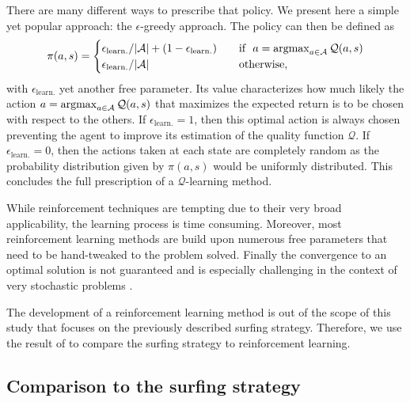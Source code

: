 There are many different ways to prescribe that policy. We present here a simple yet popular approach: the $\epsilon$-greedy approach.
The policy can then be defined as
\begin{equation}
	\pi(a, s) = \begin{cases}
		\epsilon_{\mathrm{learn.}}/\lvert\mathcal{A}\rvert + (1 - \epsilon_{\mathrm{learn.}}) & \quad \text{if}~~a = \operatorname{argmax}_{a \in \mathcal{A}} \mathcal{Q}(a, s)\\
		\epsilon_{\mathrm{learn.}}/\lvert\mathcal{A}\rvert & \quad \text{otherwise},
	\end{cases}
\end{equation}
with $\epsilon_{\mathrm{learn.}}$ yet another free parameter.
Its value characterizes how much likely the action $a = \operatorname{argmax}_{a \in \mathcal{A}} \mathcal{Q}(a, s)$ that maximizes the expected return is to be chosen with respect to the others.
If $\epsilon_{\mathrm{learn.}} = 1$, then this optimal action is always chosen preventing the agent to improve its estimation of the quality function $\mathcal{Q}$.
If $\epsilon_{\mathrm{learn.}} = 0$, then the actions taken at each state are completely random as the probability distribution given by $\pi(a, s)$ would be uniformly distributed.
This concludes the full prescription of a $\mathcal{Q}$-learning method.

While reinforcement techniques are tempting due to their very broad applicability, the learning process is time consuming.
Moreover, most reinforcement learning methods are build upon numerous free parameters that need to be hand-tweaked to the problem solved.
Finally the convergence to an optimal solution is not guaranteed and is especially challenging in the context of very stochastic problems \citep{alageshan2020machine}.

The development of a reinforcement learning method is out of the scope of this study that focuses on the previously described surfing strategy.
Therefore, we use the result of \citep{alageshan2020machine} to compare the surfing strategy to reinforcement learning.

\subsection{Comparison to the surfing strategy}\label{sec:comparison_reinforcement_learning}

